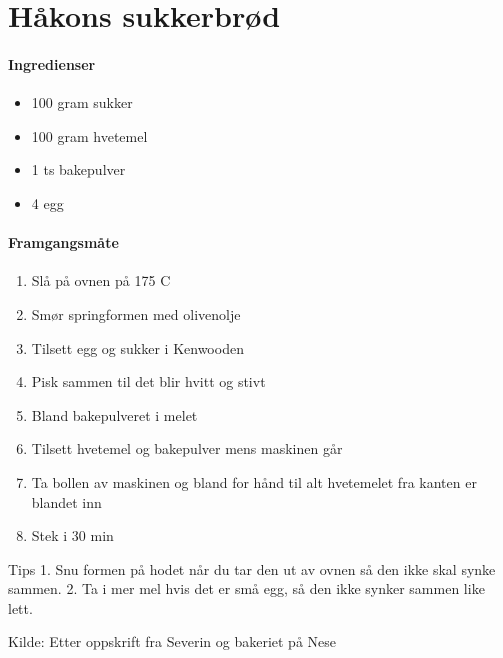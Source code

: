 \section{﻿Håkons sukkerbrød }
\label{sukkerbrod}

\paragraph{Ingredienser}
\begin{itemize}[noitemsep]
	\item 100 gram sukker
	\item 100 gram hvetemel
	\item 1 ts bakepulver
	\item 4 egg
\end{itemize}

\paragraph{Framgangsmåte}
\begin{enumerate}[noitemsep]
	\item Slå på ovnen på 175 \degree C
	\item Smør springformen med olivenolje
	\item Tilsett egg og sukker i Kenwooden
	\item Pisk sammen til det blir hvitt og stivt
	\item Bland bakepulveret i melet
	\item Tilsett hvetemel og bakepulver mens maskinen går
	\item Ta bollen av maskinen og bland for hånd til alt hvetemelet fra kanten er blandet inn
	\item Stek i 30 min
\end{enumerate}


Tips
1. Snu formen på hodet når du tar den ut av ovnen så den ikke skal synke sammen.
2. Ta i mer mel hvis det er små egg, så den ikke synker sammen like lett.

Kilde: Etter oppskrift fra Severin og bakeriet på Nese
